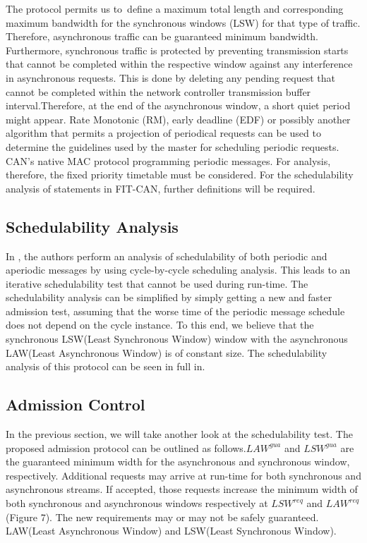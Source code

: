 \documentclass[conference]{IEEEtran}
\begin{document}
The protocol permits us to define a maximum total length and corresponding maximum bandwidth for the synchronous windows (LSW) for that type of traffic. Therefore, asynchronous traffic can be guaranteed minimum bandwidth. Furthermore, synchronous traffic is protected by preventing transmission starts that cannot be completed within the respective window against any interference in asynchronous requests. This is done by deleting any pending request that cannot be completed within the network controller transmission buffer interval.Therefore, at the end of the asynchronous window, a short quiet period might appear. Rate Monotonic (RM), early deadline (EDF) or possibly another algorithm that permits a projection of periodical requests can be used to determine the guidelines used by the master for scheduling periodic requests. CAN's native MAC protocol programming periodic messages. For analysis, therefore, the fixed priority timetable must be considered. For the schedulability analysis of statements in FIT-CAN, further definitions will be required.




\subsection{Schedulability Analysis}
In \cite{almeida_ftt-can_2002}, the authors perform an analysis of schedulability of both periodic and aperiodic messages by using cycle-by-cycle scheduling analysis. This leads to an iterative schedulability test that cannot be used during run-time. The schedulability analysis can be simplified by simply getting a new and faster admission test, assuming that the worse time of the periodic message schedule does not depend on the cycle instance. To this end, we believe that the synchronous LSW(Least Synchronous Window) window with the asynchronous LAW(Least Asynchronous Window)  is of constant size. The schedulability analysis of this protocol can be seen in full in\cite{1377703}.

\subsection{Admission Control}
In the previous section, we will take another look at the schedulability test. The proposed admission protocol can be outlined as follows.$LAW^{gua}$ and $LSW^{gua}$ are the guaranteed minimum width for the asynchronous and synchronous window, respectively. Additional requests may arrive at run-time for both synchronous and asynchronous streams. If accepted, those requests increase the minimum width of both synchronous and asynchronous windows respectively at $LSW^{req}$ and $LAW^{req}$ (Figure 7). The new requirements may or may not be safely guaranteed.
LAW(Least Asynchronous Window) and LSW(Least Synchronous Window).
\end{document}
